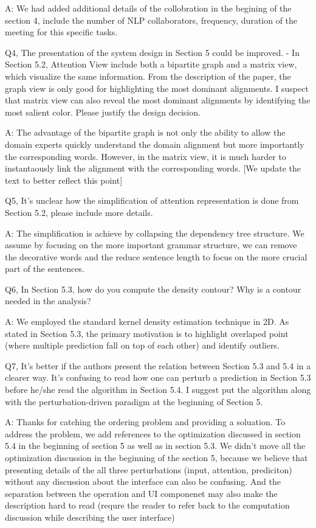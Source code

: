 A: We had added additional details of the collobration in the begining of the section 4, include the number of NLP collaborators, frequency, duration of the meeting for this specific tasks.

Q4, The presentation of the system design in Section 5 could be improved.
- In Section 5.2, Attention View include both a bipartite graph and a matrix view, which visualize the same information. From the description of the paper, the graph view is only good for highlighting the most dominant alignments. I suspect that matrix view can also reveal the most dominant alignments by identifying the most salient color. Please justify the design decision.

A: The advantage of the bipartite graph is not only the ability to allow the domain experts quickly understand the domain alignment but more importantly the corresponding words. However, in the matrix view, it is much harder to instantaously link the alignment with the corresponding words. [We update the text to better reflect this point]

Q5, It's unclear how the simplification of attention representation is done from Section 5.2, please include more details.

A: The simplification is achieve by collapsing the dependency tree structure. We assume by focusing on the more important grammar structure, we can remove the decorative words and the reduce sentence length to focus on the more crucial part of the sentences.

Q6, In Section 5.3, how do you compute the density contour? Why is a contour needed in the analysis?

A: We employed the standard kernel density estimation technique in 2D. As stated in Section 5.3, the primary motivation is to highlight overlaped point (where multiple prediction fall on top of each other) and identify outliers.

Q7, It's better if the authors present the relation between Section 5.3 and 5.4 in a clearer way. It's confusing to read how one can perturb a prediction in Section 5.3 before he/she read the algorithm in Section 5.4. I suggest put the algorithm along with the perturbation-driven paradigm at the beginning of Section 5.

A: Thanks for catching the ordering problem and providing a soluation. To address the problem, we add references to the optimization discussed in section 5.4 in the beginning of section 5 as well as in section 5.3. We didn't move all the optimization discussion in the beginning of the section 5, because we believe that presenting details of the all three perturbations (input, attention, prediciton) without any discussion about the interface can also be confusing. And the separation between the operation and UI componenet may also make the description hard to read (requre the reader to refer back to the computation discussion while describing the user interface)

